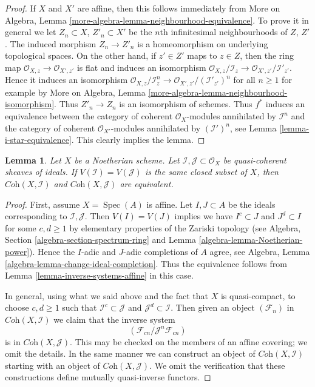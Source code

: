 \documentclass{stacks-project}
\theoremstyle{plain}
\newtheorem{lemma}[subsection]{Lemma}
\theoremstyle{definition}
\theoremstyle{remark}
\numberwithin{equation}{subsection}
\def\Spec{\mathop{\mathrm{Spec}}}
\begin{document}
\begin{proof}
If $X$ and $X'$ are affine, then this follows immediately from
More on Algebra, Lemma \ref{more-algebra-lemma-neighbourhood-equivalence}.
To prove it in general we let $Z_n \subset X$, $Z'_n \subset X'$
be the $n$th infinitesimal neighbourhoods of $Z$, $Z'$.
The induced morphism $Z_n \to Z'_n$ is a homeomorphism on
underlying topological spaces. On the other hand, if $z' \in Z'$
maps to $z \in Z$, then the ring map
$\mathcal{O}_{X, z} \to \mathcal{O}_{X', z'}$ is flat
and induces an isomorphism
$\mathcal{O}_{X, z}/\mathcal{I}_z \to \mathcal{O}_{X', z'}/\mathcal{I}'_{z'}$.
Hence it induces an isomorphism
$\mathcal{O}_{X, z}/\mathcal{I}_z^n \to
\mathcal{O}_{X', z'}/(\mathcal{I}'_{z'})^n$
for all $n \geq 1$ for example by
More on Algebra, Lemma \ref{more-algebra-lemma-neighbourhood-isomorphism}.
Thus $Z'_n \to Z_n$ is an isomorphism of schemes.
Thus $f^*$ induces an equivalence between the
category of coherent $\mathcal{O}_X$-modules annihilated by $\mathcal{I}^n$
and the
category of coherent $\mathcal{O}_{X'}$-modules annihilated by
$(\mathcal{I}')^n$, see
Lemma \ref{lemma-i-star-equivalence}.
This clearly implies the lemma.
\end{proof}

\begin{lemma}
\label{lemma-inverse-systems-ideals-equivalence}
Let $X$ be a Noetherian scheme. Let
$\mathcal{I}, \mathcal{J} \subset \mathcal{O}_X$
be quasi-coherent sheaves of ideals.
If $V(\mathcal{I}) = V(\mathcal{J})$ is the same closed subset
of $X$, then $\textit{Coh}(X, \mathcal{I})$ and $\textit{Coh}(X, \mathcal{J})$
are equivalent.
\end{lemma}

\begin{proof}
First, assume $X = \Spec(A)$ is affine. Let $I, J \subset A$ be the ideals
corresponding to $\mathcal{I}, \mathcal{J}$. Then $V(I) = V(J)$
implies we have $I^c \subset J$ and $J^d \subset I$ for some $c, d \geq 1$
by elementary properties of the Zariski topology
(see Algebra, Section \ref{algebra-section-spectrum-ring} and
Lemma \ref{algebra-lemma-Noetherian-power}).
Hence the $I$-adic and $J$-adic completions of $A$ agree, see
Algebra, Lemma \ref{algebra-lemma-change-ideal-completion}.
Thus the equivalence follows from Lemma \ref{lemma-inverse-systems-affine}
in this case.

\medskip\noindent
In general, using what we said above and the fact that
$X$ is quasi-compact, to choose $c, d \geq 1$ such that
$\mathcal{I}^c \subset \mathcal{J}$ and $\mathcal{J}^d \subset \mathcal{I}$.
Then given an object $(\mathcal{F}_n)$ in
$\textit{Coh}(X, \mathcal{I})$ we claim that the
inverse system
$$
(\mathcal{F}_{cn}/\mathcal{J}^n\mathcal{F}_{cn})
$$
is in $\textit{Coh}(X, \mathcal{J})$. This may be checked on
the members of an affine covering; we omit the details.
In the same manner we can construct an object of
$\textit{Coh}(X, \mathcal{I})$ starting with an object of
$\textit{Coh}(X, \mathcal{J})$. We omit the verification
that these constructions define mutually quasi-inverse functors.
\end{proof}
\end{document}
